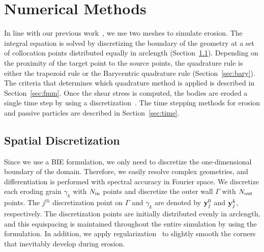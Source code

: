 \documentclass{jfm}
\begin{document}
\section{Numerical Methods}
\label{sec:method}
In line with our previous work~\citep{qua-moo2018}, we use two meshes to
simulate erosion. The integral equation is solved by discretizing the
boundary of the geometry at a set of collocation points distributed
equally in arclength (Section~\ref{sec:spatialDiscretization}).
Depending on the proximity of the target point to the source points, the
quadrature rule is either the trapezoid rule or the Barycentric
quadrature rule (Section~\ref{sec:bary}).  The criteria that determines
which quadrature method is applied is described in
Section~\ref{sec:fmm}.  Once the shear stress is computed, the bodies
are eroded a single time step by using a {\thL}
discretization~\citep{hou-low-she1994, moore2013self}.  The time stepping
methods for erosion and passive particles are described in
Section~\ref{sec:time}.

\subsection{Spatial Discretization}
\label{sec:spatialDiscretization}
Since we use a BIE formulation, we only need to discretize the
one-dimensional boundary of the domain.  Therefore, we easily resolve
complex geometries, and differentiation is performed with spectral
accuracy in Fourier space.  We discretize each eroding grain $\gamma_k$
with $N_{\mathrm{in}}$ points and discretize the outer wall $\Gamma$ with
$N_{\mathrm{out}}$ points.  The $j^{th}$ discretization point on $\Gamma$ and
$\gamma_k$ are denoted by ${\mathbf{y}}_j^0$ and ${\mathbf{y}}^k_j$, respectively.  The
discretization points are initially distributed evenly in arclength, and
this equispacing is maintained throughout the entire simulation by using
the {\thL} formulation.  In addition, we apply
regularization~\citep{qua-moo2018} to slightly smooth the corners that
inevitably develop during erosion.
\end{document}
